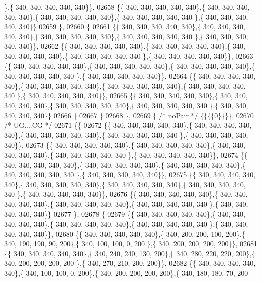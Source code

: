 \begin{DoxyCode}
      \},\{ 340, 340, 340, 340, 340\}\},
02658 \{\{ 340, 340, 340, 340, 340\},\{ 340, 340, 340, 340, 340\},\{ 340, 340, 340, 340, 340\},\{ 340, 340, 340, 340, 340
      \},\{ 340, 340, 340, 340, 340\}\}
02659 \},
02660 \{
02661 \{\{ 340, 340, 340, 340, 340\},\{ 340, 340, 340, 340, 340\},\{ 340, 340, 340, 340, 340\},\{ 340, 340, 340, 340, 340
      \},\{ 340, 340, 340, 340, 340\}\},
02662 \{\{ 340, 340, 340, 340, 340\},\{ 340, 340, 340, 340, 340\},\{ 340, 340, 340, 340, 340\},\{ 340, 340, 340, 340, 340
      \},\{ 340, 340, 340, 340, 340\}\},
02663 \{\{ 340, 340, 340, 340, 340\},\{ 340, 340, 340, 340, 340\},\{ 340, 340, 340, 340, 340\},\{ 340, 340, 340, 340, 340
      \},\{ 340, 340, 340, 340, 340\}\},
02664 \{\{ 340, 340, 340, 340, 340\},\{ 340, 340, 340, 340, 340\},\{ 340, 340, 340, 340, 340\},\{ 340, 340, 340, 340, 340
      \},\{ 340, 340, 340, 340, 340\}\},
02665 \{\{ 340, 340, 340, 340, 340\},\{ 340, 340, 340, 340, 340\},\{ 340, 340, 340, 340, 340\},\{ 340, 340, 340, 340, 340
      \},\{ 340, 340, 340, 340, 340\}\}
02666 \}
02667 \}
02668 \},
02669 \{ \textcolor{comment}{/* noPair */} \{\{\{\{0\}\}\}\},
02670 \textcolor{comment}{/* UG....CG */}
02671 \{\{
02672 \{\{ 340, 340, 340, 340, 340\},\{ 340, 340, 340, 340, 340\},\{ 340, 340, 340, 340, 340\},\{ 340, 340, 340, 340, 340
      \},\{ 340, 340, 340, 340, 340\}\},
02673 \{\{ 340, 340, 340, 340, 340\},\{ 340, 340, 340, 340, 340\},\{ 340, 340, 340, 340, 340\},\{ 340, 340, 340, 340, 340
      \},\{ 340, 340, 340, 340, 340\}\},
02674 \{\{ 340, 340, 340, 340, 340\},\{ 340, 340, 340, 340, 340\},\{ 340, 340, 340, 340, 340\},\{ 340, 340, 340, 340, 340
      \},\{ 340, 340, 340, 340, 340\}\},
02675 \{\{ 340, 340, 340, 340, 340\},\{ 340, 340, 340, 340, 340\},\{ 340, 340, 340, 340, 340\},\{ 340, 340, 340, 340, 340
      \},\{ 340, 340, 340, 340, 340\}\},
02676 \{\{ 340, 340, 340, 340, 340\},\{ 340, 340, 340, 340, 340\},\{ 340, 340, 340, 340, 340\},\{ 340, 340, 340, 340, 340
      \},\{ 340, 340, 340, 340, 340\}\}
02677 \},
02678 \{
02679 \{\{ 340, 340, 340, 340, 340\},\{ 340, 340, 340, 340, 340\},\{ 340, 340, 340, 340, 340\},\{ 340, 340, 340, 340, 340
      \},\{ 340, 340, 340, 340, 340\}\},
02680 \{\{ 340, 340, 340, 340, 340\},\{ 340, 200, 200, 100, 200\},\{ 340, 190, 190,  90, 200\},\{ 340, 100, 100,   0, 200
      \},\{ 340, 200, 200, 200, 200\}\},
02681 \{\{ 340, 340, 340, 340, 340\},\{ 340, 240, 240, 130, 200\},\{ 340, 280, 220, 220, 200\},\{ 340, 200, 200, 200, 200
      \},\{ 340, 270, 210, 200, 200\}\},
02682 \{\{ 340, 340, 340, 340, 340\},\{ 340, 100, 100,   0, 200\},\{ 340, 200, 200, 200, 200\},\{ 340, 180, 180,  70, 200

\end{DoxyCode}
